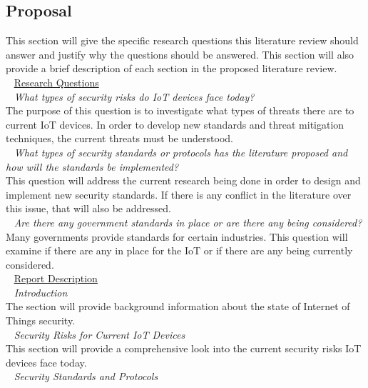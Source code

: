 \documentclass[letterpaper, 12pt]{texMemo}
\begin{document}
\begin{flushleft}
\subsection*{Proposal}
This section will give the specific research questions this literature review should answer and justify why the questions should be answered. This section will also provide a brief description of each section in the proposed literature review. \\
~\newline
\underline{Research Questions}\\
~\newline
\textit{What types of security risks do IoT devices face today?}\\
The purpose of this question is to investigate what types of threats there are to current IoT devices. In order to develop new standards and threat mitigation techniques,
the current threats must be understood. \\
~\newline
\textit{What types of security standards or protocols has the literature proposed and how will the standards be implemented?}\\
This question will address the current research being done in order to design and implement new security standards. If there is any conflict in the literature over this issue,
that will also be addressed. \\
~\newline
\textit{Are there any government standards in place or are there any being considered?}\\
Many governments provide standards for certain industries. This question will examine if there are any in place for the IoT or if there are any being
currently considered.\\ 
~\newline
\underline{Report Description}\\
~\newline
\textit{Introduction}\\
The section will provide background information about the state of Internet of Things security.\\ 
~\newline
\textit{Security Risks for Current IoT Devices}\\
This section will provide a comprehensive look into the current security risks IoT devices face today. \\
~\newline
\textit{Security Standards and Protocols}\\

\end{flushleft}
\end{document}
